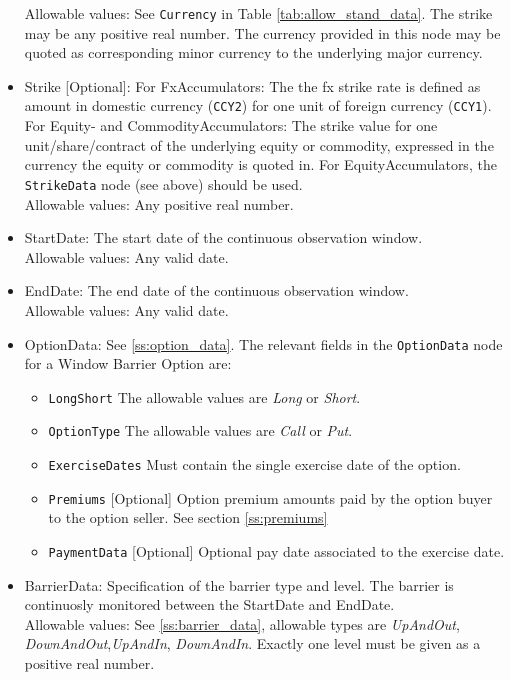 \begin{itemize}
Allowable values: See \lstinline!Currency! in Table \ref{tab:allow_stand_data}. The strike may be any positive real
number. The currency provided in this node may be quoted as corresponding minor currency to the underlying major
currency.

\item Strike [Optional]: For FxAccumulators: The the fx strike rate is defined as amount in domestic currency
  (\lstinline!CCY2!) for one unit of foreign currency (\lstinline!CCY1!). For Equity- and CommodityAccumulators: The
  strike value for one unit/share/contract of the underlying equity or commodity, expressed in the currency the equity
  or commodity is quoted in. For EquityAccumulators, the \lstinline!StrikeData! node (see above) should be used. \\

Allowable values: Any positive real number.

\item StartDate: The start date of the continuous observation window.\\

Allowable values: Any valid date.

\item EndDate: The end date of the continuous observation window.\\

Allowable values: Any valid date.

\item OptionData: See \ref{ss:option_data}. The relevant fields in the \lstinline!OptionData! node for a Window Barrier Option are:

\begin{itemize}
\item \lstinline!LongShort! The allowable values are \emph{Long} or \emph{Short}.
\item \lstinline!OptionType! The allowable values are \emph{Call} or \emph{Put}.
\item \lstinline!ExerciseDates! Must contain the single exercise date of the option.
\item \lstinline!Premiums! [Optional] Option premium amounts paid by the option buyer to the option seller. See section \ref{ss:premiums}
\item \lstinline!PaymentData! [Optional] Optional pay date associated to the exercise date.
\end{itemize}

\item BarrierData: Specification of the barrier type and level. The barrier is continuosly monitored between the
  StartDate and EndDate. \\

Allowable values: See \ref{ss:barrier_data}, allowable types are \emph{UpAndOut}, \emph{DownAndOut},\emph{UpAndIn},
\emph{DownAndIn}. Exactly one level must be given as a positive real number.

\end{itemize}

